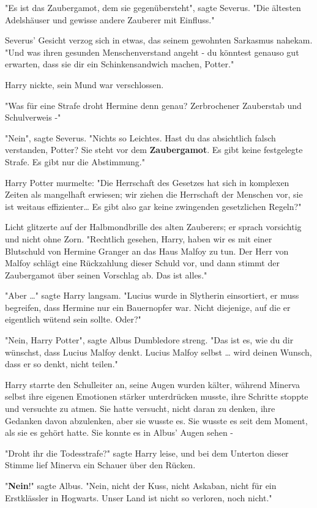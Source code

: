 {"Es ist das Zaubergamot, dem sie gegenübersteht", sagte Severus. "Die ältesten Adelshäuser und gewisse andere Zauberer mit Einfluss."

Severus' Gesicht verzog sich in etwas, das seinem gewohnten Sarkasmus nahekam. "Und was ihren gesunden Menschenverstand angeht - du könntest genauso gut erwarten, dass sie dir ein Schinkensandwich machen, Potter."

Harry nickte, sein Mund war verschlossen.

"Was für eine Strafe droht Hermine denn genau? Zerbrochener Zauberstab und Schulverweis -"

"Nein", sagte Severus. "Nichts so Leichtes. Hast du das absichtlich falsch verstanden, Potter? Sie steht vor dem \textbf{Zaubergamot}. Es gibt keine festgelegte Strafe. Es gibt nur die Abstimmung."

Harry Potter murmelte: "Die Herrschaft des Gesetzes hat sich in komplexen Zeiten als mangelhaft erwiesen; wir ziehen die Herrschaft der Menschen vor, sie ist weitaus effizienter… Es gibt also gar keine zwingenden gesetzlichen Regeln?"

Licht glitzerte auf der Halbmondbrille des alten Zauberers; er sprach vorsichtig und nicht ohne Zorn. "Rechtlich gesehen, Harry, haben wir es mit einer Blutschuld von Hermine Granger an das Haus Malfoy zu tun. Der Herr von Malfoy schlägt eine Rückzahlung dieser Schuld vor, und dann stimmt der Zaubergamot über seinen Vorschlag ab. Das ist alles."

"Aber …" sagte Harry langsam. "Lucius wurde in Slytherin einsortiert, er muss begreifen, dass Hermine nur ein Bauernopfer war. Nicht diejenige, auf die er eigentlich wütend sein sollte. Oder?"

"Nein, Harry Potter", sagte Albus Dumbledore streng. "Das ist es, wie du dir wünschst, dass Lucius Malfoy denkt. Lucius Malfoy selbst … wird deinen Wunsch, dass er so denkt, nicht teilen."

Harry starrte den Schulleiter an, seine Augen wurden kälter, während Minerva selbst ihre eigenen Emotionen stärker unterdrücken musste, ihre Schritte stoppte und versuchte zu atmen. Sie hatte versucht, nicht daran zu denken, ihre Gedanken davon abzulenken, aber sie wusste es. Sie wusste es seit dem Moment, als sie es gehört hatte. Sie konnte es in Albus' Augen sehen -

"Droht ihr die Todesstrafe?" sagte Harry leise, und bei dem Unterton dieser Stimme lief Minerva ein Schauer über den Rücken.

"\textbf{Nein}!" sagte Albus. "Nein, nicht der Kuss, nicht Askaban, nicht für ein Erstklässler in Hogwarts. Unser Land ist nicht so verloren, noch nicht."

}
